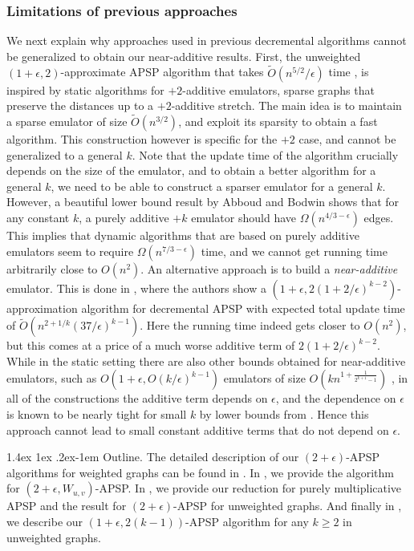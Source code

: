 \documentclass[11pt]{article}
\makeatletter
\theoremstyle{definition}
\theoremstyle{remark}
\renewcommand{\paragraph}{%
  \@startsection{paragraph}{4}%
  {\z@}{1.4ex \@plus 1ex \@minus .2ex}{-1em}%
  {\normalfont\normalsize\bfseries}%
}
\makeatother
\begin{document}
\begin{titlepage}
\subsubsection{Limitations of previous approaches} 
We next explain why approaches used in previous decremental algorithms cannot be generalized to obtain our near-additive results. First, the unweighted $(1+\epsilon,2)$-approximate APSP algorithm that takes $\tilde{O}(n^{5/2}/\epsilon)$ time \cite{HKN2016}, is inspired by static algorithms for $+2$-additive emulators, sparse graphs that preserve the distances up to a $+2$-additive stretch. The main idea is to maintain a sparse emulator of size $\tilde{O}(n^{3/2})$, and exploit its sparsity to obtain a fast algorithm. This construction however is specific for the $+2$ case, and cannot be generalized to a general $k$. Note that the update time of the algorithm crucially depends on the size of the emulator, and to obtain a better algorithm for a general $k$, we need to be able to construct a sparser emulator for a general $k$.
However, a beautiful lower bound result by Abboud and Bodwin \cite{abboud20174} shows that for any constant $k$, a purely additive $+k$ emulator should have $\Omega(n^{4/3-\epsilon})$ edges. 
This implies that dynamic algorithms that are based on purely additive emulators seem to require $\Omega(n^{7/3-\epsilon})$ time, and we cannot get running time arbitrarily close to $O(n^2)$. An alternative approach is to build a \emph{near-additive} emulator. This is done in \cite{HKN14}, where the authors show a $(1+\epsilon, 2(1+2/\epsilon)^{k-2})$-approximation algorithm for decremental APSP with expected total update time of $\tilde{O}(n^{2+1/k} (37/\epsilon)^{k-1})$. Here the running time indeed gets closer to $O(n^2)$, but this comes at a price of a much worse additive term of $2(1+2/\epsilon)^{k-2}$. While in the static setting there are also other bounds obtained for near-additive emulators, such as $O(1+\epsilon,O(k/\epsilon)^{k-1})$ emulators of size $O(kn^{1+\frac{1}{2^{k+1}-1}})$ \cite{elkin2004,thorup2006spanners,abboud2018hierarchy,elkin2020near}, in all of the constructions the additive term depends on $\epsilon$, and the dependence on $\epsilon$ is known to be nearly tight for small $k$ by lower bounds from \cite{abboud2018hierarchy}. Hence this approach cannot lead to small constant additive terms that do not depend on $\epsilon$.


\paragraph{Outline.}
The detailed description of our $(2+\epsilon)$-APSP algorithms for weighted graphs can be found in . In , we provide the algorithm for $(2+\epsilon,W_{u,v})$-APSP. In , we provide our reduction for purely multiplicative APSP and the result for $(2+\epsilon)$-APSP for unweighted graphs. And finally in , we describe our $(1+\epsilon, 2(k-1))$-APSP algorithm for any $k \geq 2$ in unweighted graphs. 


\end{titlepage}
\end{document}
